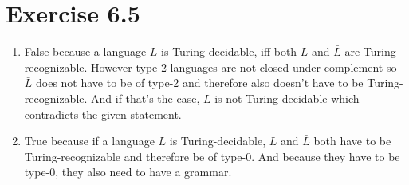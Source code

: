 \documentclass{article} %
\newcommand{\homeworkNumber}{6}
\begin{document}
\section*{Exercise \homeworkNumber.5}
\begin{enumerate}
\item False because a language $L$ is Turing-decidable, iff both $L$ and $\bar{L}$ are Turing-recognizable. However type-2 languages are not closed under complement so $\bar{L}$ does not have to be of type-2 and therefore also doesn't have to be Turing-recognizable. And if that's the case, $L$ is not Turing-decidable which contradicts the given statement.

\item True because if a language $L$ is Turing-decidable, $L$ and $\bar{L}$ both have to be Turing-recognizable and therefore be of type-0. And because they have to be type-0, they also need to have a grammar.
\end{enumerate}
\end{document}
